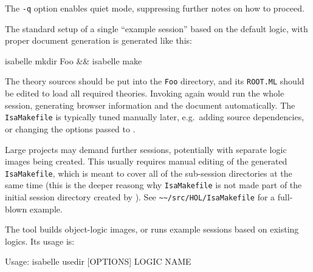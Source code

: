 \begin{isabellebody}
\begin{isamarkuptext}
  \medskip The \verb|-q| option enables quiet mode, suppressing
  further notes on how to proceed.%
\end{isamarkuptext}%
\isamarkuptrue%
%
\isamarkuptrue%
%
\begin{isamarkuptext}%
The standard setup of a single ``example session'' based on the
  default logic, with proper document generation is generated like
  this:
\begin{ttbox}
isabelle mkdir Foo && isabelle make
\end{ttbox}

  \noindent The theory sources should be put into the \verb|Foo|
  directory, and its \verb|ROOT.ML| should be edited to load all
  required theories.  Invoking \hyperlink{tool.make}{\mbox{}} again would run the whole
  session, generating browser information and the document
  automatically.  The \verb|IsaMakefile| is typically tuned
  manually later, e.g.\ adding source dependencies, or changing the
  options passed to \hyperlink{tool.usedir}{\mbox{}}.

  \medskip Large projects may demand further sessions, potentially
  with separate logic images being created.  This usually requires
  manual editing of the generated \verb|IsaMakefile|, which is
  meant to cover all of the sub-session directories at the same time
  (this is the deeper reasong why \verb|IsaMakefile| is not made
  part of the initial session directory created by \hyperlink{tool.mkdir}{\mbox{}}).
  See \verb|~~/src/HOL/IsaMakefile| for a full-blown example.%
\end{isamarkuptext}%
\isamarkuptrue%
%
\isamarkuptrue%
%
\begin{isamarkuptext}%
The \hypertarget{tool.usedir}{\hyperlink{tool.usedir}{\mbox{}}} tool builds object-logic images, or
  runs example sessions based on existing logics. Its usage is:
\begin{ttbox}
Usage: isabelle usedir [OPTIONS] LOGIC NAME


\end{ttbox}
\end{isamarkuptext}
\end{isabellebody}
